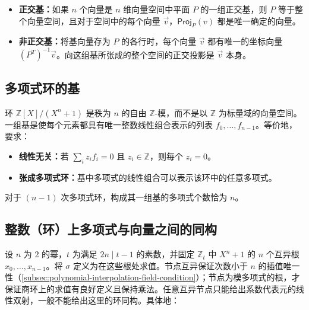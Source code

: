 \begin{tcolorbox}[title={\textbf{\tboxtheorem{\ref*{subsec:projection}} 变换后向量的唯一性}}]

\begin{itemize}
\item \textbf{正交基：}如果 $n$ 个向量是 $n$ 维向量空间中平面 $P$ 的一组正交基，则 $P$ 等于整个向量空间，且对于空间中的每个向量 $\vec{v}$，$\textsf{Proj}_P(v)$ 都是唯一确定的向量。
\item \textbf{非正交基：}将基向量存为 $P$ 的各行时，每个向量 $\vec v$ 都有唯一的坐标向量 $(P^T)^{-1}\vec v$。向这组基所张成的整个空间的正交投影是 $\vec v$ 本身。
\end{itemize}
\end{tcolorbox}




\subsection{多项式环的基}
\label{subsec:polynomial-ring-basis}

环 $\mathbb Z[X]/(X^n+1)$ 是秩为 $n$ 的自由 $\mathbb Z$-模，而不是以 $\mathbb Z$ 为标量域的向量空间。一组基是使每个元素都具有唯一整数线性组合表示的列表 $f_0,\ldots,f_{n-1}$。等价地，要求：

\begin{itemize}

\item \textbf{线性无关：}若 $\sum_i z_i f_i=0$ 且 $z_i\in\mathbb Z$，则每个 $z_i=0$。
\item \textbf{张成多项式环：}基中多项式的线性组合可以表示该环中的任意多项式。
\end{itemize}

对于 $(n-1)$ 次多项式环，构成其一组基的多项式个数恰为 $n$。


\subsection{整数（环）上多项式与向量之间的同构}
\label{subsec:poly-vector-transformation}



设 $n$ 为 $2$ 的幂，$t$ 为满足 $2n\mid t-1$ 的素数，并固定 $\mathbb Z_t$ 中 $X^n+1$ 的 $n$ 个互异根 $x_0,\ldots,x_{n-1}$。将 $\sigma$ 定义为在这些根处求值。节点互异保证次数小于 $n$ 的插值唯一性（\autoref{subsec:polynomial-interpolation-field-condition}）；节点为模多项式的根，才保证商环上的求值有良好定义且保持乘法。任意互异节点只能给出系数代表元的线性双射，一般不能给出这里的环同构。具体地：

